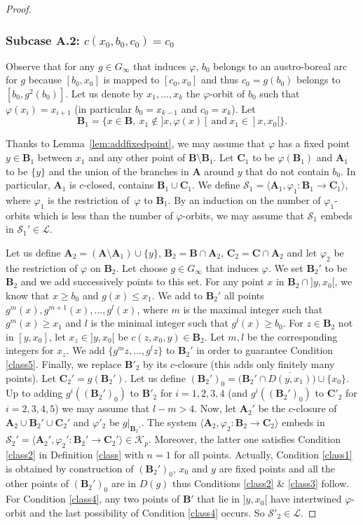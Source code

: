 \documentclass[JEP,XML,SOM,Unicode,NoFloatCountersInSection]{cedram}
\let\mathcal\mathscr
\theoremstyle{plain}
\theoremstyle{definition}
\newcommand{\bA}{{\boldsymbol{A}}}
\newcommand{\bB}{{\boldsymbol{B}}}
\newcommand{\bC}{{\boldsymbol{C}}}
\newcommand{\cK}{\mathcal{K}}
\newcommand{\cL}{\mathcal{L}}
\newcommand{\cS}{\mathcal{S}}
\begin{document}
\begin{proof}
\subsubsection*{Subcase \textup{A.2:} $c(x_0,b_0,c_0)=c_0$}
Observe that for any $g\in G_\infty$ that induces $\varphi$, $b_0$ belongs to an austro-boreal arc for $g$ because $[b_0,x_0]$ is mapped to $[c_0,x_0]$ and thus $c_0=g(b_0)$ belongs to $[b_0,g^2(b_0)]$. Let us denote by $x_1,\dots, x_k$ the $\varphi$-orbit of $b_0$ such that $\varphi(x_i)=x_{i+1}$ (in particular $b_0=x_{k-1}$ and $c_0=x_k$). Let
\[
\bB_1=\{x\in \bB,\ x_1\notin{}]x,\varphi(x)[\ \textrm{and}\ x_1\in{}]x,x_0[\}.
\]

Thanks to Lemma~\ref{lem:addfixedpoint}, we may assume that $\varphi$ has a fixed point $y\in\bB_1$ between $x_1$ and any other point of $\bB\setminus\bB_1$. Let $\bC_1$ to be $\varphi(\bB_1)$ and $\bA_1$ to be $\{y\}$ and the union of the branches in $\bA$ around $y$ that do not contain $b_0$. In particular, $\bA_1$ is $c$-closed, contains $\bB_1\cup\bC_1$. We define $\cS_1=\langle\bA_1, \varphi_1\colon \bB_1\to\bC_1\rangle$, where $\varphi_1$ is the restriction of~$\varphi$ to $\bB_1$. By an induction on the number of $\varphi_1$-orbits which is less than the number of $\varphi$-orbits, we may assume that $\cS_1$ embeds in $\cS_1'\in\cL$.

Let us define $\bA_2=(\bA\setminus \bA_1)\cup\{y\}$, $\bB_2=\bB\cap \bA_2$, $\bC_2=\bC\cap\bA_2$ and let $\varphi_2$ be the restriction of $\varphi$ on $\bB_2$. Let choose $g\in G_\infty$ that induces $\varphi$. We set $\bB_2'$ to be~$\bB_2$ and we add successively points to this set. For any point $x$ in $\bB_2\cap{}]y,x_0[$, we know that $x\geq b_0$ and $g(x)\leq x_1$. We add to $\bB_2'$ all points $g^m(x),g^{m+1}(x),\dots,g^l(x)$, where $m$ is the maximal integer such that $g^m(x)\geq x_1$ and $l$ is the minimal integer such that $g^l(x)\geq b_0$. For $z\in \bB_2$ not in $[y,x_0]$, let $x_z\in{}]y,x_0[$ be $c(z,x_0,y)\in \bB_2$. Let $m,l$ be the corresponding integers for $x_z$. We add $\{g^m{z},\dots,g^l{z}\}$ to $\bB_2'$ in order to guarantee Condition \eqref{class5}. Finally, we replace $\bB'_2$ by its $c$-closure (this adds only finitely many points). Let $\bC_2'=g(\bB_2')$. Let us define $(\bB_2')_0=\bigl(\bB_2'\cap \overline{D(y,x_1)}\bigr)\cup\{x_0\}$. Up to adding $g^i((\bB_2')_0)$ to $\bB'_2$ for $i=1,2,3,4$ (and $g^i((\bB_2')_0)$ to $\bC'_2$ for $i=2,3,4,5$) we may assume that $l-m>4$. Now, let $\bA_2'$ be the $c$-closure of $\bA_2\cup\bB_2'\cup\bC_2'$ and $\varphi'_2$ be $g|_{\bB_2'}$. The system $\langle \bA_2, \varphi_2\colon\bB_2\to\bC_2\rangle$ embeds in $\cS_2'=\langle \bA_2', \varphi_2'\colon\bB_2'\to\bC_2'\rangle\in\cK_p$. Moreover, the latter one satisfies Condition \eqref{class2} in Definition \ref{class} with $n=1$ for all points. Actually, Condition \eqref{class1} is obtained by construction of $(\bB_2')_0$, $x_0$ and $y$ are fixed points and all the other points of $(\bB_2')_0$ are in $D(g)$ thus Conditions \eqref{class2} \& \eqref{class3} follow. For Condition \eqref{class4}, any two points of $\bB'$ that lie in $]y,x_0[$ have intertwined $\varphi$-orbit and the last possibility of Condition \eqref{class4} occurs. So $\cS'_2\in\cL$.


\end{proof}
\end{document}
